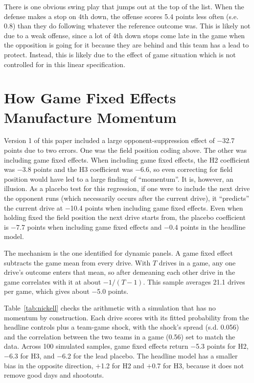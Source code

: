 \documentclass[11pt]{article}
\begin{document}
There is one obvious swing play that jumps out at the top of the list. When the defense makes a stop on 4th down, the offense scores 5.4 points less often (s.e. 0.8) than they do following whatever the reference outcome was. This is likely not due to a weak offense, since a lot of 4th down stops come late in the game when the opposition is going for it because they are behind and this team has a lead to protect. Instead, this is likely due to the effect of game situation which is not controlled for in this linear specification.

{\small\setlength{\tabcolsep}{4pt}}

\section{How Game Fixed Effects Manufacture Momentum}\label{sec:fe}

Version 1 of this paper included a large opponent-suppression effect of $-$32.7 points due to two errors. One was the field position coding above. The other was including game fixed effects. When including game fixed effects, the H2 coefficient was $-$3.8 points and the H3 coefficient was $-$6.6, so even correcting for field position would have led to a large finding of ``momentum''. It is, however, an illusion. As a placebo test for this regression, if one were to include the next drive the opponent runs (which necessarily occurs after the current drive), it ``predicts'' the current drive at $-$10.4 points when including game fixed effects. Even when holding fixed the field position the next drive starts from, the placebo coefficient is $-$7.7 points when including game fixed effects and $-$0.4 points in the headline model.



The mechanism is the one \citet{nickell1981biases} identified for dynamic panels. A game fixed effect subtracts the game mean from every drive. With $T$ drives in a game, any one drive's outcome enters that mean, so after demeaning each other drive in the game correlates with it at about $-1/(T-1)$. This sample averages 21.1 drives per game, which gives about $-$5.0 points.

Table~\ref{tab:nickell} checks the arithmetic with a simulation that has no momentum by construction. Each drive scores with its fitted probability from the headline controls plus a team-game shock, with the shock's spread (s.d. 0.056) and the correlation between the two teams in a game (0.56) set to match the data. Across 100 simulated samples, game fixed effects return $-$5.3 points for H2, $-$6.3 for H3, and $-$6.2 for the lead placebo. The headline model has a smaller bias in the opposite direction, $+$1.2 for H2 and $+$0.7 for H3, because it does not remove good days and shootouts.
\end{document}
